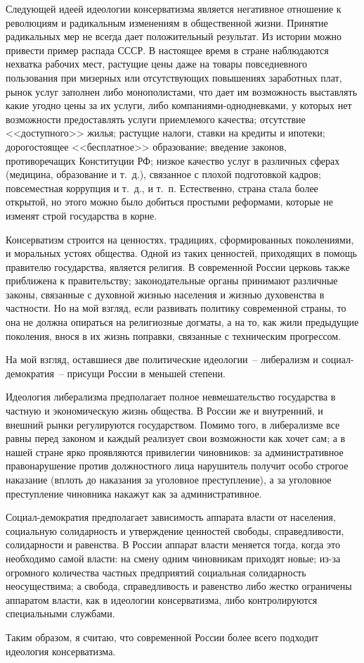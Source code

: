 \documentclass[pscyr,notitlepage]{hedwork}
\begin{document}
  Следующей идеей идеологии консерватизма является негативное отношение к
  революциям и радикальным изменениям в общественной жизни. Принятие радикальных
  мер не всегда дает положительный результат. Из истории можно привести пример
  распада СССР. В настоящее время в стране наблюдаются нехватка рабочих мест,
  растущие цены даже на товары повседневного пользования при мизерных или
  отсутствующих повышениях заработных плат, рынок услуг заполнен либо
  монополистами, что дает им возможность выставлять какие угодно цены за их
  услуги, либо компаниями-однодневками, у которых нет возможности предоставлять
  услуги приемлемого качества; отсутствие <<доступного>> жилья; растущие налоги,
  ставки на кредиты и ипотеки; дорогостоящее <<бесплатное>> образование;
  введение законов, противоречащих Конституции РФ; низкое качество услуг в
  различных сферах (медицина, образование и т.~д.), связанное с плохой
  подготовкой кадров; повсеместная коррупция и т.~д., и т.~п. Естественно,
  страна стала более открытой, но этого можно было добиться простыми реформами,
  которые не изменят строй государства в корне.

  Консерватизм строится на ценностях, традициях, сформированных поколениями, и
  моральных устоях общества. Одной из таких ценностей, приходящих в помощь
  правителю государства, является религия. В современной России церковь также
  приближена к правительству; законодательные органы принимают различные законы,
  связанные с духовной жизнью населения и жизнью духовенства в частности. Но на
  мой взгляд, если развивать политику современной страны, то она не должна
  опираться на религиозные догматы, а на то, как жили предыдущие поколения,
  внося в их жизнь поправки, связанные с техническим прогрессом.

  На мой взгляд, оставшиеся две политические идеологии~-- либерализм и
  социал-демократия~-- присущи России в меньшей степени.

  Идеология либерализма предполагает полное невмешательство государства в
  частную и экономическую жизнь общества. В России же и внутренний, и внешний
  рынки регулируются государством. Помимо того, в либерализме все равны перед
  законом и каждый реализует свои возможности как хочет сам; а в нашей стране
  ярко проявляются привилегии чиновников: за административное правонарушение
  против должностного лица нарушитель получит особо строгое наказание (вплоть
  до наказания за уголовное преступление), а за уголовное преступление чиновника
  накажут как за административное.

  Социал-демократия предполагает зависимость аппарата власти от населения,
  социальную солидарность и утверждение ценностей свободы, справедливости,
  солидарности и равенства. В России аппарат власти меняется тогда, когда это
  необходимо самой власти: на смену одним чиновникам приходят новые; из-за
  огромного количества частных предприятий социальная солидарность
  неосуществима; а свобода, справедливость и равенство либо жестко ограничены
  аппаратом власти, как в идеологии консерватизма, либо контролируются
  специальными службами.
  
  Таким образом, я считаю, что современной России более всего подходит идеология
  консерватизма.
\end{document}
